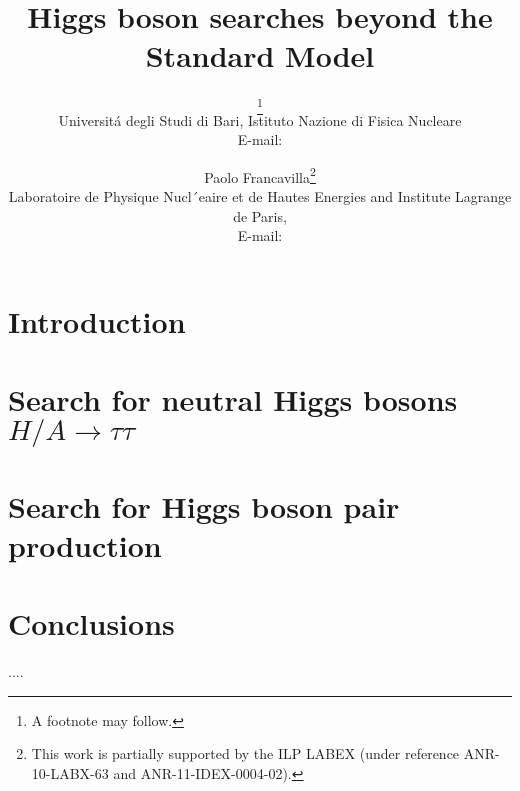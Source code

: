 \documentclass{PoS}
\title{Higgs boson searches beyond the Standard Model}
\author{\speaker{Claudio Caputo}\thanks{A footnote may follow.}\\
        Universit\'a degli Studi di Bari, Istituto Nazione di Fisica Nucleare\\
        E-mail: \email{claudio.caputo@cern.ch}}
\author{Paolo Francavilla\thanks{This work is partially supported by the ILP
LABEX (under reference ANR-10-LABX-63 and ANR-11-IDEX-0004-02).}\\
        Laboratoire de Physique Nucl´eaire et de Hautes Energies and Institute Lagrange de Paris,\\
        E-mail: \email{paolo.francavilla@cern.ch}}
\begin{document}
\section{Introduction}


\newpage
\section{Search for neutral  Higgs bosons $H/A \rightarrow \tau\tau$}


\newpage
\section{Search for Higgs boson pair production}


\newpage
\section{Conclusions}


\begin{thebibliography}{99}
....

\end{thebibliography}
\end{document}
